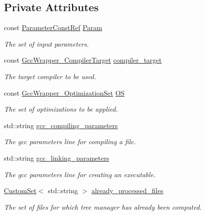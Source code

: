 \subsection*{Private Attributes}
\begin{DoxyCompactItemize}
\item 
const \hyperlink{Parameter_8hpp_a37841774a6fcb479b597fdf8955eb4ea}{Parameter\+Const\+Ref} \hyperlink{classGccWrapper_ae052c2164d449f57b725ab2d2fc41779}{Param}
\begin{DoxyCompactList}\small\item\em The set of input parameters. \end{DoxyCompactList}\item 
const \hyperlink{gcc__wrapper_8hpp_abb9d9a5cb3a1bf5d402dbc841a6708aa}{Gcc\+Wrapper\+\_\+\+Compiler\+Target} \hyperlink{classGccWrapper_a1f804f17bfd3b629339dd13a908560dd}{compiler\+\_\+target}
\begin{DoxyCompactList}\small\item\em The target compiler to be used. \end{DoxyCompactList}\item 
const \hyperlink{gcc__wrapper_8hpp_a0f57d29a8e8442ddf6d2cd8577c6788d}{Gcc\+Wrapper\+\_\+\+Optimization\+Set} \hyperlink{classGccWrapper_a5494d211289aec8f9b4231c860489c6a}{OS}
\begin{DoxyCompactList}\small\item\em The set of optimizations to be applied. \end{DoxyCompactList}\item 
std\+::string \hyperlink{classGccWrapper_aeffcdf6e69bf53f0de5f019ad102f879}{gcc\+\_\+compiling\+\_\+parameters}
\begin{DoxyCompactList}\small\item\em The gcc parameters line for compiling a file. \end{DoxyCompactList}\item 
std\+::string \hyperlink{classGccWrapper_a73c1cdd4e9d5004d193fd3af499b10fe}{gcc\+\_\+linking\+\_\+parameters}
\begin{DoxyCompactList}\small\item\em The gcc parameters line for creating an executable. \end{DoxyCompactList}\item 
\hyperlink{custom__set_8hpp_a615bc2f42fc38a4bb1790d12c759e86f}{Custom\+Set}$<$ std\+::string $>$ \hyperlink{classGccWrapper_a87bb70af9d7789b3ac105df1c5c510b6}{already\+\_\+processed\+\_\+files}
\begin{DoxyCompactList}\small\item\em The set of files for which tree manager has already been computed. \end{DoxyCompactList}\item 

\end{DoxyCompactItemize}
